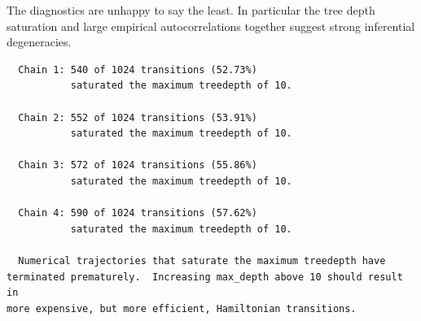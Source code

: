 \documentclass[
  letterpaper,
  DIV=11,
  numbers=noendperiod]{scrartcl}
\newenvironment{Shaded}{\begin{snugshade}}{\end{snugshade}}
\newcommand{\AttributeTok}[1]{\textcolor[rgb]{0.40,0.45,0.13}{#1}}
\newcommand{\ConstantTok}[1]{\textcolor[rgb]{0.56,0.35,0.01}{#1}}
\newcommand{\FunctionTok}[1]{\textcolor[rgb]{0.28,0.35,0.67}{#1}}
\newcommand{\NormalTok}[1]{\textcolor[rgb]{0.00,0.23,0.31}{#1}}
\newcommand{\OtherTok}[1]{\textcolor[rgb]{0.00,0.23,0.31}{#1}}
\newcommand{\SpecialCharTok}[1]{\textcolor[rgb]{0.37,0.37,0.37}{#1}}
\newcommand{\StringTok}[1]{\textcolor[rgb]{0.13,0.47,0.30}{#1}}
\begin{document}
The diagnostics are unhappy to say the least. In particular the tree
depth saturation and large empirical autocorrelations together suggest
strong inferential degeneracies.

\begin{Shaded}
\end{Shaded}

\begin{verbatim}
  Chain 1: 540 of 1024 transitions (52.73%)
           saturated the maximum treedepth of 10.

  Chain 2: 552 of 1024 transitions (53.91%)
           saturated the maximum treedepth of 10.

  Chain 3: 572 of 1024 transitions (55.86%)
           saturated the maximum treedepth of 10.

  Chain 4: 590 of 1024 transitions (57.62%)
           saturated the maximum treedepth of 10.

  Numerical trajectories that saturate the maximum treedepth have
terminated prematurely.  Increasing max_depth above 10 should result in
more expensive, but more efficient, Hamiltonian transitions.
\end{verbatim}

\begin{Shaded}
\end{Shaded}
\end{document}
